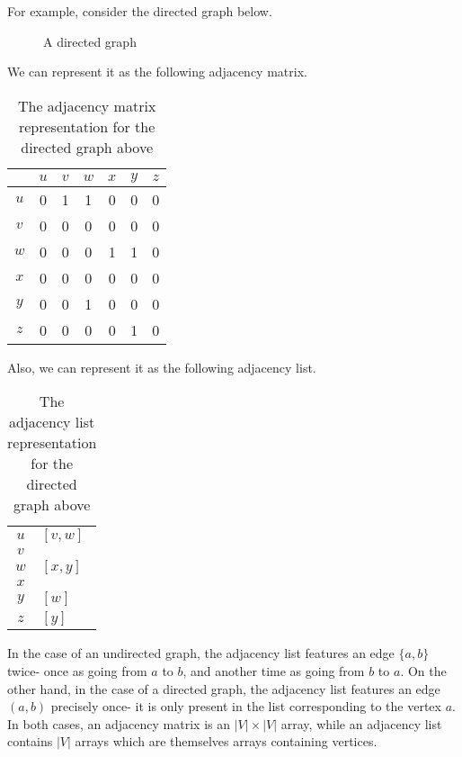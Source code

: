 \documentclass[a4paper, openany]{memoir}
\begin{document}
For example, consider the directed graph below.
\begin{figure}[H]
    \centering
    \caption{A directed graph}
\end{figure}
\noindent We can represent it as the following adjacency matrix.
\begin{table}[H]
    \centering
    \begin{tabular}{c|cccccc}
         & $u$ & $v$ & $w$ & $x$ & $y$ & $z$ \\
        \hline
        $u$ & 0 & 1 & 1 & 0 & 0 & 0 \\
        $v$ & 0 & 0 & 0 & 0 & 0 & 0 \\
        $w$ & 0 & 0 & 0 & 1 & 1 & 0 \\
        $x$ & 0 & 0 & 0 & 0 & 0 & 0 \\
        $y$ & 0 & 0 & 1 & 0 & 0 & 0 \\
        $z$ & 0 & 0 & 0 & 0 & 1 & 0
    \end{tabular}
    \caption{The adjacency matrix representation for the directed graph above}
\end{table}
\noindent Also, we can represent it as the following adjacency list.
\begin{table}[H]
    \centering
    \begin{tabular}{c|l}
        $u$ & $[v, w]$ \\
        $v$ & \\
        $w$ & $[ x, y]$ \\
        $x$ & \\
        $y$ & $[w]$ \\
        $z$ & $[y]$
    \end{tabular}
    \caption{The adjacency list representation for the directed graph above}
\end{table}
In the case of an undirected graph, the adjacency list features an edge $\{a, b\}$ twice- once as going from $a$ to $b$, and another time as going from $b$ to $a$. On the other hand, in the case of a directed graph, the adjacency list features an edge $(a, b)$ precisely once- it is only present in the list corresponding to the vertex $a$. In both cases, an adjacency matrix is an $|V| \times |V|$ array, while an adjacency list contains $|V|$ arrays which are themselves arrays containing vertices.
\end{document}
